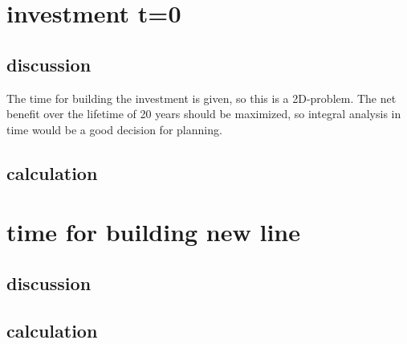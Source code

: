 \documentclass{article}
\begin{document}
\section{investment t=0}
\subsection{discussion}
The time for building the investment is given, so this is a 2D-problem. The net benefit over the lifetime of 20 years should be maximized, so integral analysis in time would be a good decision for planning.
\subsection{calculation}

\section{time for building new line}
\subsection{discussion}
\subsection{calculation}
\end{document}

